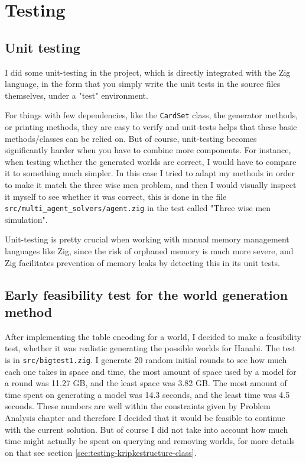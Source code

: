 \section{Testing}

\subsection{Unit testing}
I did some unit-testing in the project, which is directly integrated with the Zig language, in the form that you simply write the unit tests in the source files themselves, under a "test" environment. 

For things with few dependencies, like the {\tt CardSet} class, the generator methods, or printing methods, they are easy to verify and unit-tests helps that these basic methods/classes can be relied on.
But of course, unit-testing becomes significantly harder when you have to combine more components.
For instance, when testing whether the generated worlds are correct, I would have to compare it to something much simpler.
In this case I tried to adapt my methods in order to make it match the three wise men problem, and then I would visually inspect it myself to see whether it was correct, this is done in the file {\tt src/multi\_agent\_solvers/agent.zig} in the test called "Three wise men simulation".

Unit-testing is pretty crucial when working with manual memory management languages like Zig, since the risk of orphaned memory is much more severe, and Zig facilitates prevention of memory leaks by detecting this in its unit tests. 


\subsection{Early feasibility test for the world generation method}
After implementing the table encoding for a world, I decided to make a feasibility test, whether it was realistic generating the possible worlds for Hanabi.
The test is in {\tt src/bigtest1.zig}.
I generate 20 random initial rounds to see how much each one takes in space and time, the most amount of space used by a model for a round was 11.27 GB, and the least space was 3.82 GB.
The most amount of time spent on generating a model was 14.3 seconds, and the least time was 4.5 seconds.
These numbers are well within the constraints given by Problem Analysis chapter and therefore I decided that it would be feasible to continue with the current solution.
But of course I did not take into account how much time might actually be spent on querying and removing worlds, for more details on that see section \ref{sec:testing-kripkestructure-class}.

